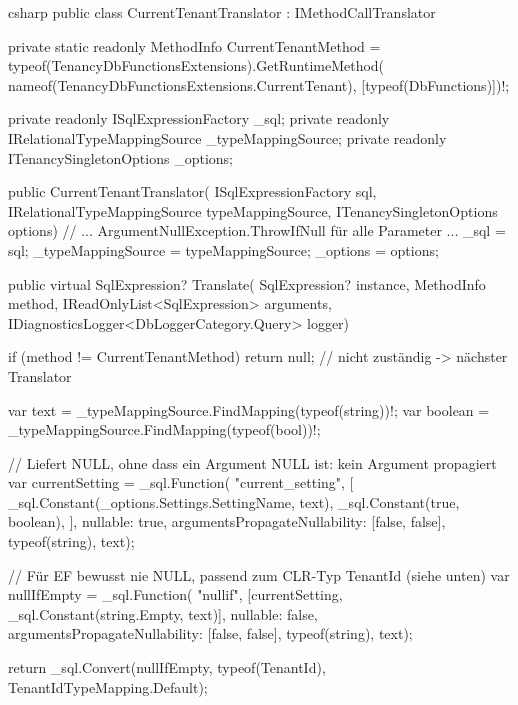 \begin{sourcecode}{csharp}
public class CurrentTenantTranslator : IMethodCallTranslator
{
    private static readonly MethodInfo CurrentTenantMethod =
        typeof(TenancyDbFunctionsExtensions).GetRuntimeMethod(
            nameof(TenancyDbFunctionsExtensions.CurrentTenant), [typeof(DbFunctions)])!;

    private readonly ISqlExpressionFactory _sql;
    private readonly IRelationalTypeMappingSource _typeMappingSource;
    private readonly ITenancySingletonOptions _options;

    public CurrentTenantTranslator(
        ISqlExpressionFactory sql,
        IRelationalTypeMappingSource typeMappingSource,
        ITenancySingletonOptions options)
    {
        // ... ArgumentNullException.ThrowIfNull für alle Parameter ...
        _sql = sql;
        _typeMappingSource = typeMappingSource;
        _options = options;
    }

    public virtual SqlExpression? Translate(
        SqlExpression? instance, MethodInfo method,
        IReadOnlyList<SqlExpression> arguments,
        IDiagnosticsLogger<DbLoggerCategory.Query> logger)
    {
        if (method != CurrentTenantMethod)
            return null;                          // nicht zuständig -> nächster Translator

        var text = _typeMappingSource.FindMapping(typeof(string))!;
        var boolean = _typeMappingSource.FindMapping(typeof(bool))!;

        // Liefert NULL, ohne dass ein Argument NULL ist: kein Argument propagiert
        var currentSetting = _sql.Function(
            "current_setting",
            [
                _sql.Constant(_options.Settings.SettingName, text),
                _sql.Constant(true, boolean),
            ],
            nullable: true,
            argumentsPropagateNullability: [false, false],
            typeof(string), text);

        // Für EF bewusst nie NULL, passend zum CLR-Typ TenantId (siehe unten)
        var nullIfEmpty = _sql.Function(
            "nullif",
            [currentSetting, _sql.Constant(string.Empty, text)],
            nullable: false,
            argumentsPropagateNullability: [false, false],
            typeof(string), text);

        return _sql.Convert(nullIfEmpty, typeof(TenantId), TenantIdTypeMapping.Default);
    }
}
\end{sourcecode}

